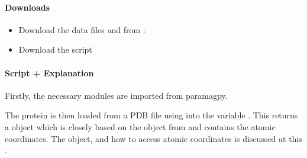 \documentclass[a4paper,10pt,english,openany,oneside]{sphinxmanual}
\begin{document}
\paragraph{Downloads}
\label{\detokenize{examples/pcs_fit:downloads}}\begin{itemize}
\item {} 
Download the data files  and  from :

\item {} 
Download the script 

\end{itemize}


\paragraph{Script + Explanation}
\label{\detokenize{examples/pcs_fit:script-explanation}}
Firstly, the necessary modules are imported from paramagpy.

%
\begin{sphinxVerbatim}[commandchars=\\\{\}]
      
\end{sphinxVerbatim}

The protein is then loaded from a PDB file using {\hyperref[\detokenize{reference/generated/paramagpy.protein.load_pdb:paramagpy.protein.load_pdb}]{}} into the variable . This returns a  object which is closely based on the  object from  and contains the atomic coordinates. The object, and how to access atomic coordinates is discussed at this .

%
\begin{sphinxVerbatim}[commandchars=\\\{\}]
  
\end{sphinxVerbatim}
\end{document}
